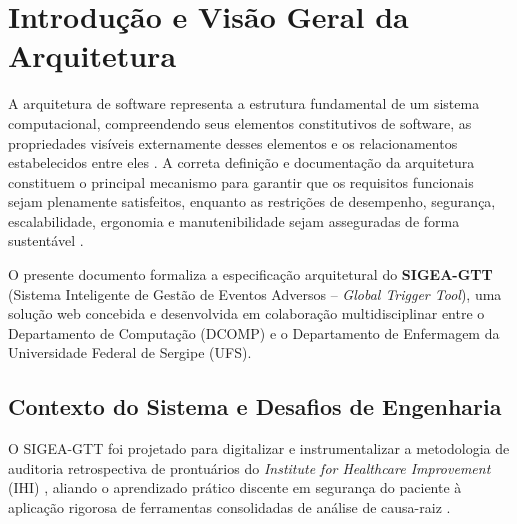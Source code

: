 \chapter{Introdução e Visão Geral da Arquitetura}
\label{cap_introducao_visao_geral}

A arquitetura de software representa a estrutura fundamental de um sistema computacional, compreendendo seus elementos constitutivos de software, as propriedades visíveis externamente desses elementos e os relacionamentos estabelecidos entre eles \cite{bass2021}. A correta definição e documentação da arquitetura constituem o principal mecanismo para garantir que os requisitos funcionais sejam plenamente satisfeitos, enquanto as restrições de desempenho, segurança, escalabilidade, ergonomia e manutenibilidade sejam asseguradas de forma sustentável \cite{richards2020,sommerville2019}.

O presente documento formaliza a especificação arquitetural do \textbf{SIGEA-GTT} (Sistema Inteligente de Gestão de Eventos Adversos -- \textit{Global Trigger Tool}), uma solução web concebida e desenvolvida em colaboração multidisciplinar entre o Departamento de Computação (DCOMP) e o Departamento de Enfermagem da Universidade Federal de Sergipe (UFS).

\section{Contexto do Sistema e Desafios de Engenharia}
\label{sec_contexto_sistema}

O SIGEA-GTT foi projetado para digitalizar e instrumentalizar a metodologia de auditoria retrospectiva de prontuários do \textit{Institute for Healthcare Improvement} (IHI) \cite{griffin2009ihi}, aliando o aprendizado prático discente em segurança do paciente à aplicação rigorosa de ferramentas consolidadas de análise de causa-raiz \cite{ishikawa1982,deming1986}.

